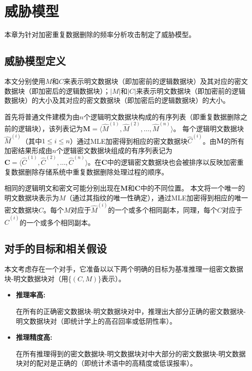 \chapter{威胁模型}
\label{sec:ThreatModel}
本章为针对加密重复数据删除的频率分析攻击制定了威胁模型。

\section{威胁模型定义}
\label{sec:ThreatModel-Definitions}

本文分别使用$M$和$C$来表示明文数据块（即加密前的逻辑数据块）及其对应的密文数据块（即加密后的逻辑数据块）；$|M|$和$|C|$来表示明文数据块（即加密前的逻辑数据块）的大小及其对应的密文数据块（即加密后的逻辑数据块）的大小。

首先将普通文件建模为由$n$个逻辑明文数据块构成的有序列表（即重复数据删除之前的逻辑块），该列表记为$\mathbf{M} = \langle \hat{M}^{(1)}, \hat{M}^{(2)}, \ldots, \hat{M}^{(n)}\rangle$。 每个逻辑明文数据块$\hat{M}^{(i)}$（其中$1\le i\le n$）通过MLE加密得到相应的密文数据块$\hat{C}^{(i)}$。由$\mathbf{M}$的所有加密结果形成由$n$个逻辑密文数据块组成的有序列表记为$\mathbf{C} = \langle \hat{C}^{(1)}, \hat{C}^{(2)}, \ldots, \hat{C}^{(n)} \rangle$。在$\mathbf{C}$中的逻辑密文数据块也会被排序以反映加密重复数据删除存储系统中重复数据删除处理过程的顺序。

相同的逻辑明文和密文可能分别出现在$\mathbf{M}$和$\mathbf{C}$中的不同位置。 本文将一个唯一的明文数据块表示为$M$（通过其指纹的唯一性确定），通过MLE加密得到相应的唯一密文数据块$C$。每个$M$对应于$\hat{M}^{(i)}$的一个或多个相同副本，同理，每个$C$对应于$\hat{C}^{(i)}$的一个或多个相同副本。


\section{对手的目标和相关假设}
\label{sec:ThreatModel-Assumptions}

本文考虑存在一个对手，它准备以以下两个明确的目标为基准推理一组密文数据块-明文数据块对（用\{$(C, M)$\}表示）。


\begin{itemize}
    \item \textbf{推理率高:} 
    
    在所有的正确密文数据块-明文数据块对中，推理出大部分正确的密文数据块-明文数据块对（即统计学上的高召回率或低阴性率）。

    \item \textbf{推理精度高:} 
    
    在所有推理得到的密文数据块-明文数据块对中大部分的密文数据块-明文数据块对的配对是正确的（即统计术语中的高精度或低误报率）。
\end{itemize}
  

